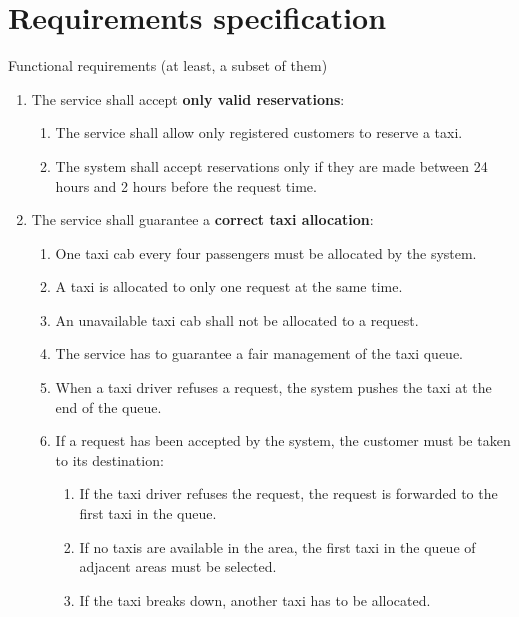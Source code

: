    \section{Requirements specification} 


\begin{frame}[allowframebreaks]{Functional requirements (at least, a subset of them)}

\begin{enumerate}
			
	\item The service shall accept \textbf{only valid reservations}: \begin{enumerate}
		\item The service shall allow only registered customers to reserve a taxi.
		\item The system shall accept reservations only if they are made between 24 hours and 2 hours before the request time.
	\end{enumerate}


	\item The service shall guarantee a \textbf{correct taxi allocation}: \begin{enumerate}
		\item One taxi cab every four passengers must be allocated by the system.
		\item A taxi is allocated to only one request at the same time.
		\item An unavailable taxi cab shall not be allocated to a request.
		\item The service has to guarantee a fair management of the taxi queue.
		\item When a taxi driver refuses a request, the system pushes the taxi at the end of the queue.
		\item If a request has been accepted by the system, the customer must be taken to its destination: \begin{enumerate}
			\item If the taxi driver refuses the request, the request is forwarded to the first taxi in the queue.
			\item If no taxis are available in the area, the first taxi in the queue of adjacent areas must be selected.
			\item If the taxi breaks down, another taxi has to be allocated.
		\end{enumerate}
	\end{enumerate}
 
\end{enumerate}
\end{frame}
